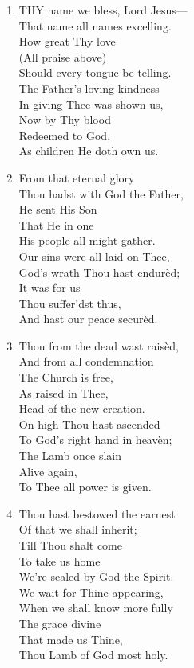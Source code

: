 \begin{enumerate}
    \item THY name we bless, Lord Jesus--- \\
        That name all names excelling. \\
            How great Thy love \\
            (All praise above) \\
        Should every tongue be telling. \\
        The Father's loving kindness \\
        In giving Thee was shown us, \\
            Now by Thy blood \\
            Redeemed to God, \\
        As children He doth own us.

    \item From that eternal glory \\
        Thou hadst with God the Father, \\
            He sent His Son \\
            That He in one \\
        His people all might gather. \\
        Our sins were all laid on Thee, \\
        God's wrath Thou hast endur\`ed; \\
            It was for us \\
            Thou suffer'dst thus, \\
        And hast our peace secur\`ed.

    \item Thou from the dead wast rais\`ed, \\
        And from all condemnation \\
            The Church is free, \\
            As raised in Thee, \\
        Head of the new creation. \\
        On high Thou hast ascended \\
        To God's right hand in heav\`en; \\
            The Lamb once slain \\
            Alive again, \\
        To Thee all power is given.

    \item Thou hast bestowed the earnest \\
        Of that we shall inherit; \\
            Till Thou shalt come \\
            To take us home \\
        We're sealed by God the Spirit. \\
        We wait for Thine appearing, \\
        When we shall know more fully \\
            The grace divine \\
            That made us Thine, \\
        Thou Lamb of God most holy.


\end{enumerate}
